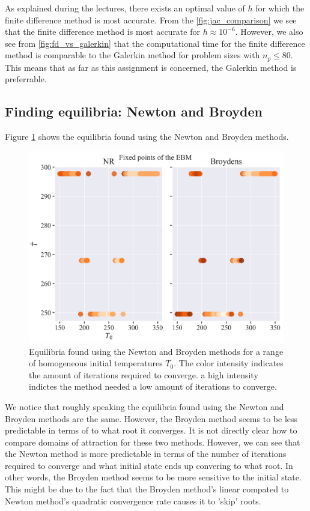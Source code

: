 As explained during the lectures, there exists an optimal value of $h$ for which the finite difference method is most accurate. 
From the \ref{fig:jac_comparison} we see that the finite difference method is most accurate for $h \approx 10^{-6}$. However, we also 
see from \ref{fig:fd_vs_galerkin} that the computational time for the finite difference method is comparable to the Galerkin method for problem
sizes with $n_p \leq 80$. This means that as far as this assignment is concerned, the Galerkin method is preferrable.

\subsection{Finding equilibria: Newton and Broyden}
Figure \ref{fig:equilibria} shows the equilibria found using the Newton and Broyden methods. 
\begin{figure}[H]
    \centering
    \includegraphics[width=\textwidth]{figures/fixed_points.png}
    \caption{Equilibria found using the Newton and Broyden methods for a range of homogeneous initial temperatures $T_0$. 
    The color intensity indicates the amount of iterations required to converge.
    a high intensity indictes the method needed a low amount of iterations to converge.}
    \label{fig:equilibria}
\end{figure}
We notice that roughly speaking the equilibria found using the Newton and Broyden methods are the same. However, the Broyden method
seems to be less predictable in terms of to what root it converges. It is not directly clear how to compare domains of attraction 
for these two methods. However, we can see that the Newton method is more predictable in terms of the number of iterations required to converge and
what initial state ends up convering to what root. In other words, the Broyden method seems to be more sensitive to the initial state.
This might be due to the fact that the Broyden method's linear compated to Newton method's quadratic convergence rate causes it to 'skip' roots.

